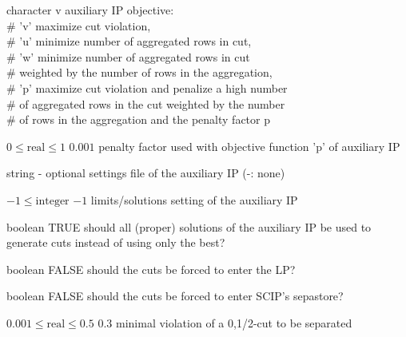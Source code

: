 %
{character}%
{v}%
{auxiliary IP objective:\\   \#                      'v' maximize cut violation,\\   \#                      'u' minimize number of aggregated rows in cut,\\   \#                      'w' minimize number of aggregated rows in cut\\   \#                          weighted by the number of rows in the aggregation,\\   \#                      'p' maximize cut violation and penalize a high number\\   \#                          of aggregated rows in the cut weighted by the number\\   \#                          of rows in the aggregation and the penalty factor p}%
{}

%
{$0\leq\textrm{real}\leq1$}%
{$0.001$}%
{penalty factor used with objective function 'p' of auxiliary IP}%
{}

%
{string}%
{-}%
{optional settings file of the auxiliary IP (-: none)}%
{}

%
{$-1\leq\textrm{integer}$}%
{$-1$}%
{limits/solutions setting of the auxiliary IP}%
{}

%
{boolean}%
{TRUE}%
{should all (proper) solutions of the auxiliary IP be used to generate cuts instead of using only the best?}%
{}

%
{boolean}%
{FALSE}%
{should the cuts be forced to enter the LP?}%
{}

%
{boolean}%
{FALSE}%
{should the cuts be forced to enter SCIP's sepastore?}%
{}

%
{$0.001\leq\textrm{real}\leq0.5$}%
{$0.3$}%
{minimal violation of a {0,1/2}-cut to be separated}%
{}

